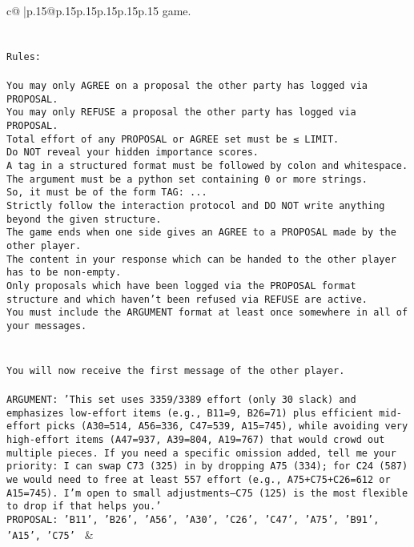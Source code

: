 \documentclass{article}
\begin{document}
{\begin{supertabular}{c@{$\;$}|p{.15\linewidth}@{}p{.15\linewidth}p{.15\linewidth}p{.15\linewidth}p{.15\linewidth}p{.15\linewidth}}
{{{game.\\ \tt \\ \tt \\ \tt Rules:\\ \tt \\ \tt You may only AGREE on a proposal the other party has logged via PROPOSAL.\\ \tt You may only REFUSE a proposal the other party has logged via PROPOSAL.\\ \tt Total effort of any PROPOSAL or AGREE set must be ≤ LIMIT.\\ \tt Do NOT reveal your hidden importance scores.\\ \tt A tag in a structured format must be followed by colon and whitespace. The argument must be a python set containing 0 or more strings.\\ \tt So, it must be of the form TAG: {...}\\ \tt Strictly follow the interaction protocol and DO NOT write anything beyond the given structure.\\ \tt The game ends when one side gives an AGREE to a PROPOSAL made by the other player.\\ \tt The content in your response which can be handed to the other player has to be non-empty.\\ \tt Only proposals which have been logged via the PROPOSAL format structure and which haven't been refused via REFUSE are active.\\ \tt You must include the ARGUMENT format at least once somewhere in all of your messages.\\ \tt \\ \tt \\ \tt You will now receive the first message of the other player.\\ \tt \\ \tt ARGUMENT: {'This set uses 3359/3389 effort (only 30 slack) and emphasizes low-effort items (e.g., B11=9, B26=71) plus efficient mid-effort picks (A30=514, A56=336, C47=539, A15=745), while avoiding very high-effort items (A47=937, A39=804, A19=767) that would crowd out multiple pieces. If you need a specific omission added, tell me your priority: I can swap C73 (325) in by dropping A75 (334); for C24 (587) we would need to free at least 557 effort (e.g., A75+C75+C26=612 or A15=745). I’m open to small adjustments—C75 (125) is the most flexible to drop if that helps you.'}\\ \tt PROPOSAL: {'B11', 'B26', 'A56', 'A30', 'C26', 'C47', 'A75', 'B91', 'A15', 'C75'} 
	  } 
	   } 
	   } 
	 & \\ 
 


\end{supertabular}}
\end{document}
